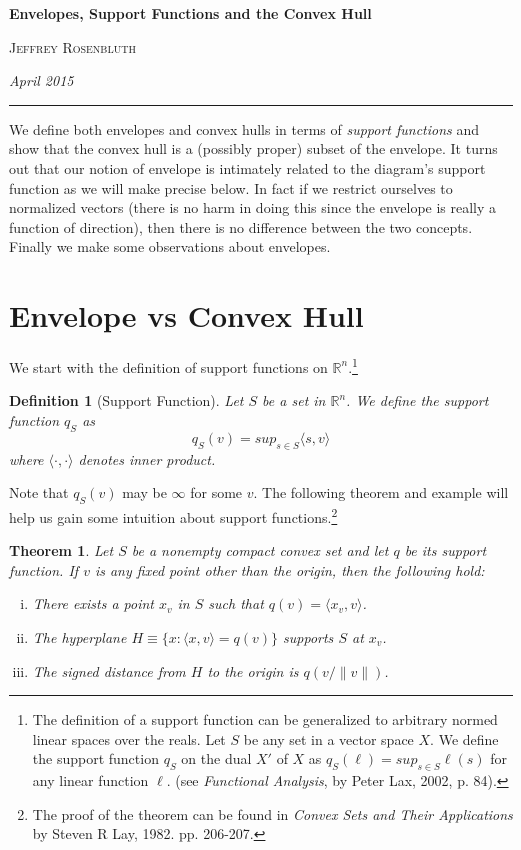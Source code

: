\documentclass[11pt]{amsart}
\newtheorem{defn}{Definition}
\newtheorem{thm}{Theorem}
\begin{document}
  \begin{center}
    \bigskip
    \textbf{Envelopes, Support Functions and the Convex Hull}

    \textsc{Jeffrey Rosenbluth}

    \textit{April 2015}
  \end{center}
  \hrule
  \vspace{0.25in}

  We define both envelopes and convex hulls in terms of \emph{support functions} and show
  that the convex hull is a (possibly proper) subset of the envelope. It turns out that our notion of
  envelope is intimately related to the diagram's support function as we will make precise below.
  In fact if we restrict ourselves to normalized vectors (there is no harm in doing this since the envelope
  is really a function of direction), then there is no difference between the two concepts.
  Finally we make some observations about envelopes.

  \section{Envelope vs Convex Hull}

  We start with the definition of support functions
  on  $\mathbb{R}^n$.\footnote{
  The definition of a support function can be generalized to arbitrary normed linear spaces over the reals.
  Let $S$ be any set in a vector space $X$. We define the support function $q_S$ on the dual $X'$ of $X$ as
  $q_S(\ell) = sup_{s \in S} \ell(s)$
  for any linear function $\ell.$
  (see \emph{Functional Analysis}, by Peter Lax, 2002, p. 84).}
  \begin{defn}[Support Function]
    \label{supportfunc}
    Let $S$ be a set in $\mathbb{R}^n$. We define the support function $q_S$ as
    $$q_S(v) = sup_{s \in S} \langle s,v \rangle$$
    where $\langle \cdot, \cdot \rangle$ denotes inner product.
  \end{defn}

  Note that $q_S(v)$ may be $\infty$ for some $v$. The following theorem
  and example will help us gain some intuition about support functions.\footnote{The proof of the theorem can
  be found in \emph{Convex Sets and Their Applications} by Steven R Lay, 1982. pp. 206-207.}

  \begin{thm}
    Let $S$ be a nonempty compact convex set and let $q$ be its support function. If $v$ is any fixed point other
    than the origin, then the following hold:
    \begin{enumerate}[i.]
      \item There exists a point $x_v$ in $S$ such that $q(v)=\langle x_v, v \rangle$.
      \item The hyperplane $H \equiv \{x : \langle x, v \rangle = q(v)\}$ supports $S$ at $x_v$.
      \item The signed distance from $H$ to the origin is $q(v/\|v\|)$.
    \end{enumerate}
  \end{thm}
\end{document}

